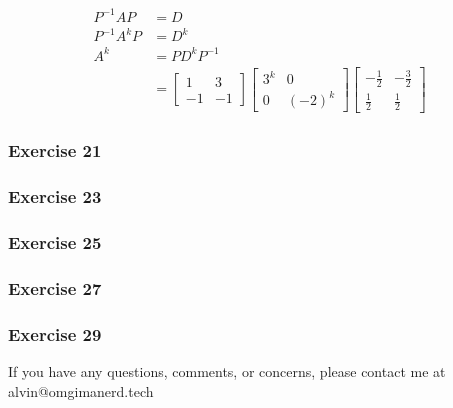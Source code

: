 \documentclass{math}
\begin{document}
\begin{align*}
  P^{-1}AP &= D \\
  P^{-1}A^kP &= D^k \\
  A^k &= PD^kP^{-1} \\
  &= \begin{bmatrix}1 & 3 \\ -1 & -1\end{bmatrix}
    \begin{bmatrix}3^k & 0 \\ 0 & (-2)^k\end{bmatrix}
    \begin{bmatrix}
      -\frac{1}{2} & -\frac{3}{2} \\
      \frac{1}{2} & \frac{1}{2}
    \end{bmatrix}
\end{align*}

\subsubsection*{Exercise 21}
\subsubsection*{Exercise 23}
\subsubsection*{Exercise 25}
\subsubsection*{Exercise 27}
\subsubsection*{Exercise 29}

\begin{center}
  If you have any questions, comments, or concerns, please contact me at
  alvin@omgimanerd.tech
\end{center}
\end{document}
